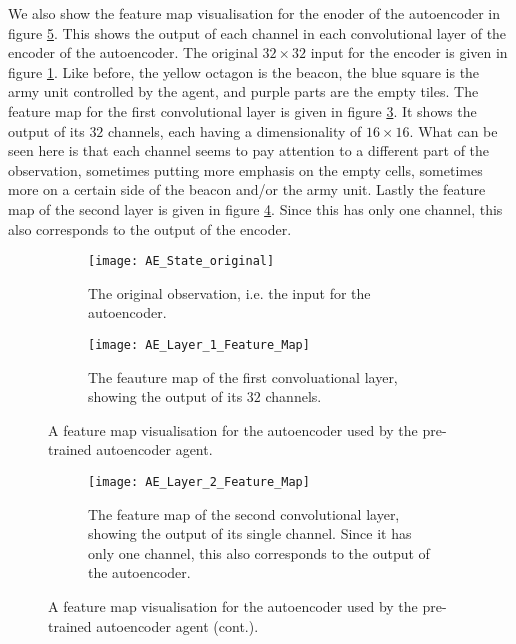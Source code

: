 We also show the feature map visualisation for the enoder of the autoencoder in figure \ref{fig:ae-featuremap}. This shows the output of each channel in each convolutional layer of the encoder of the autoencoder. The original $32 \times 32$ input for the encoder is given in figure \ref{fig:ae-featuremap-original}. Like before, the yellow octagon is the beacon, the blue square is the army unit controlled by the agent, and purple parts are the empty tiles. The feature map for the first convolutional layer is given in figure \ref{fig:ae-featuremap-layer1}. It shows the output of its $32$ channels, each having a dimensionality of $16 \times 16$. What can be seen here is that each channel seems to pay attention to a different part of the observation, sometimes putting more emphasis on the empty cells, sometimes more on a certain side of the beacon and/or the army unit. Lastly the feature map of the second layer is given in figure \ref{fig:ae-featuremap-layer2}. Since this has only one channel, this also corresponds to the output of the encoder. 


\begin{figure}[h]
	\centering
	\begin{subfigure}[b]{1\textwidth}
		\texttt{[image: AE\_State\_original]}
		\caption{The original observation, i.e. the input for the autoencoder.}
		\label{fig:ae-featuremap-original} 
	\end{subfigure}
	\begin{subfigure}[b]{1\textwidth}
		\texttt{[image: AE\_Layer\_1\_Feature\_Map]}
		\caption{The feauture map of the first convoluational layer, showing the output of its $32$ channels.}
		\label{fig:ae-featuremap-layer1}
	\end{subfigure}
	\caption{A feature map visualisation for the autoencoder used by the pre-trained autoencoder agent.}
\end{figure}%
\begin{figure}[ht]\ContinuedFloat
	\begin{subfigure}[b]{1\textwidth}
		\texttt{[image: AE\_Layer\_2\_Feature\_Map]}
		\caption{The feature map of the second convolutional layer, showing the output of its single channel. Since it has only one channel, this also corresponds to the output of the autoencoder.}
		\label{fig:ae-featuremap-layer2}
	\end{subfigure}
	\caption{A feature map visualisation for the autoencoder used by the pre-trained autoencoder agent (cont.).}
	\label{fig:ae-featuremap}
\end{figure}

